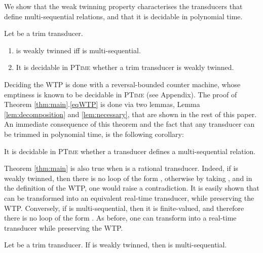 \documentclass[envcountsame]{llncs}
\begin{document}
We show that the weak twinning property characterises the
transducers that define multi-sequential relations, and that it is
decidable in polynomial time. 

\vspace{-1mm}
\begin{theorem}\label{thm:main}
    Let  be a trim transducer. 
\vspace{-1mm}
\begin{enumerate}
\item\label{eqWTP}  is weakly twinned iff  is
  multi-sequential. 
\item\label{decWTP} It is decidable in \textsc{PTime} whether a trim
  transducer is weakly twinned. 
\end{enumerate}
\end{theorem}

Deciding the WTP is done with a reversal-bounded counter machine,
whose emptiness is known to be decidable in \textsc{PTime} \cite{JACM::Ibarra1978}
(see Appendix). The proof of Theorem
\ref{thm:main}.\ref{eqWTP} is done via two lemmas, Lemma
\ref{lem:decomposition} and \ref{lem:necessary}, that are shown in the
rest of this paper. An immediate consequence of this theorem and the
fact that any transducer can be trimmed
in polynomial time, is the following corollary:
\vspace{-1mm}
\begin{corollary}
    It is decidable in \textsc{PTime} whether a transducer defines a
    multi-sequential relation. 
\end{corollary}


\begin{remark}\label{rm:realtime} Theorem \ref{thm:main} is also true
    when  is a rational transducer. Indeed, if  is weakly twinned,
    then there is no loop of the form , otherwise by taking ,
     and  in the definition of
    the WTP, one would raise a contradiction. It is easily shown that
     can be transformed into an equivalent real-time transducer,
    while preserving the WTP. Conversely, if  is
    multi-sequential, then it is finite-valued, and therefore there is
    no loop of the form . As before, one can transform  into a real-time
    transducer while preserving the WTP. 
\end{remark}

\begin{lemma}\label{lem:decomposition}
    Let  be a trim transducer. If  is weakly twinned, then
     is multi-sequential.
\end{lemma}
\end{document}
